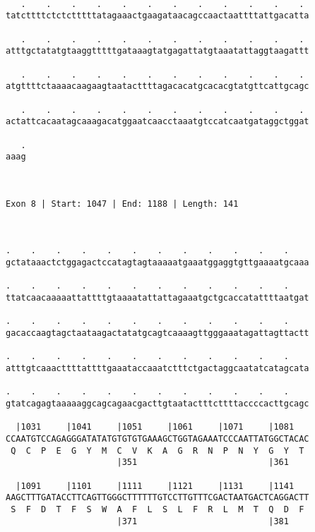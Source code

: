 \documentclass{article}
\begin{document}
\begin{Verbatim}
  
   .    .    .    .    .    .    .    .    .    .    .    . 
tatcttttctctctttttatagaaactgaagataacagccaactaattttattgacatta
                                                            
   .    .    .    .    .    .    .    .    .    .    .    . 
atttgctatatgtaaggtttttgataaagtatgagattatgtaaatattaggtaagattt
                                                            
   .    .    .    .    .    .    .    .    .    .    .    . 
atgttttctaaaacaagaagtaatacttttagacacatgcacacgtatgttcattgcagc
                                                            
   .    .    .    .    .    .    .    .    .    .    .    . 
actattcacaatagcaaagacatggaatcaacctaaatgtccatcaatgataggctggat
                                                            
   .
aaag
    
    
 
Exon 8 | Start: 1047 | End: 1188 | Length: 141



.    .    .    .    .    .    .    .    .    .    .    .    
gctataaactctggagactccatagtagtaaaaatgaaatggaggtgttgaaaatgcaaa
                                                            
.    .    .    .    .    .    .    .    .    .    .    .    
ttatcaacaaaaattattttgtaaaatattattagaaatgctgcaccatattttaatgat
                                                            
.    .    .    .    .    .    .    .    .    .    .    .    
gacaccaagtagctaataagactatatgcagtcaaaagttgggaaatagattagttactt
                                                            
.    .    .    .    .    .    .    .    .    .    .    .    
atttgtcaaacttttattttgaaataccaaatctttctgactaggcaatatcatagcata
                                                            
.    .    .    .    .    .    .    .    .    .    .    .    
gtatcagagtaaaaaggcagcagaacgacttgtaatactttcttttaccccacttgcagc
                                                            
  |1031     |1041     |1051     |1061     |1071     |1081   
CCAATGTCCAGAGGGATATATGTGTGTGAAAGCTGGTAGAAATCCCAATTATGGCTACAC
 Q  C  P  E  G  Y  M  C  V  K  A  G  R  N  P  N  Y  G  Y  T 
                      |351                          |361    
  
  |1091     |1101     |1111     |1121     |1131     |1141   
AAGCTTTGATACCTTCAGTTGGGCTTTTTTGTCCTTGTTTCGACTAATGACTCAGGACTT
 S  F  D  T  F  S  W  A  F  L  S  L  F  R  L  M  T  Q  D  F 
                      |371                          |381    
  

\end{Verbatim}
\end{document}
